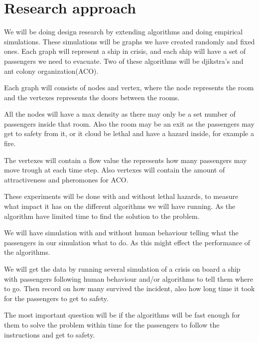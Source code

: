 \chapter{Research approach}
\label{ch:approach}




We will be doing design research by extending algorithms and doing empirical simulations. These simulations will be graphs we have created randomly and fixed ones. Each graph will represent a ship in crisis, and each ship will have a set of passengers we need to evacuate.
Two of these algorithms will be djikstra's and ant colony organization(ACO).

Each graph will consists of nodes and vertex, where the node represents the room and the vertexes represents the doors between the rooms. 

All the nodes will have a max density as there may only be a set number of passengers inside that room. Also the room may be an exit as the passengers may get to safety from it, or it cloud be lethal and have a hazard inside, for example a fire.

The vertexes will contain a flow value the represents how many passengers may move trough at each time step. Also vertexes will contain the amount of attractiveness and pheromones for ACO.

These experiments will be done with and without lethal hazards, to measure what impact it has on the different algorithms we will have running. As the algorithm have limited time to find the solution to the problem.

We will have simulation with and without human behaviour telling what the passengers in our simulation what to do. As this might effect the performance of the algorithms.

We will get the data by running several simulation of a crisis on board a ship with passengers following human behaviour and/or algorithms to tell them where to go. Then record on how many survived the incident, also how long time it took for the passengers to get to safety. 

The most important question will be if the algorithms will be fast enough for them to solve the problem within time for the passengers to follow the instructions and get to safety.


 

